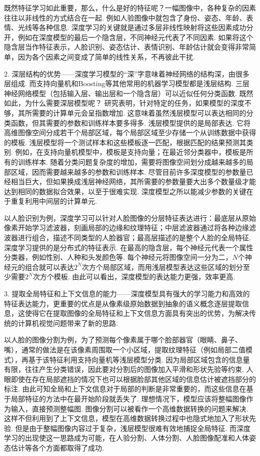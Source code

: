 既然特征学习如此重要，那么，什么是好的特征呢？一幅图像中，各种复杂的因素往往以非线性的方式结合在一起. 例如人验图像中就包含了身份、姿态、年龄、表情、光线等各种信息. 深度学习的关键就是通过多层非线性映射将这些因素成功分开，例如在深度模型的最后一个隐含层，不同神经元代表了不同因素. 如果将这个隐含层当作特征表示，人脸识别、姿态估计、表情识别、年龄估计就会变得非常简单，因为各个因素之间变成了简单的线性关系，不再彼此干扰.

2. 深层结构的优势——深度学习模型的“深”字意味着神经网络的结构深，由很多层组成. 而支持向量机和Boosting等其他常用的机器学习模型都是浅层结构. 三层神经网络模型（包括输入层、输出层和一个隐含层）可以近似任何分类函数. 既然如此，为什么需要深层模型呢？
研究表明，针对特定的任务，如果模型的深度不够，其所需要的计算单元会呈指数增加. 这意味着虽然浅层模型可以表达相同的分类函数，但其需要的参数和训练样本要多得多. 浅层模型提供的是局部表达. 它将高维图像空间分成若干个局部区域，每个局部区域至少存储一个从训练数据中获得的模板. 浅层模型将一个测试样本和这些模板逐一匹配，根据匹配的结果预测其类别. 例如，在支持向量机模型中，模板是支持向量；在最近邻分类器中，模板是所有的训练样本. 随着分类问题复杂度的增加，需要将图像空间划分成越来越多的局部区域，因而需要越来越多的参数和训练样本. 尽管目前许多深度模型的参数量已经相当巨大，但如果换成浅层神经网络，其所需要的参数量要大出多个数量级才能达到相同的数据拟合效果，以至于很难实现.
深度模型之所以能减少参数的关键在于重复利用中间层的计算单元.

\begin{example}
以人脸识别为例，深度学习可以针对人脸图像的分层特征表达进行：最底层从原始像素开始学习滤波器，刻画局部的边缘和纹理特征；中层滤波器通过将各种边缘滤波器进行组合，描述不同类型的人脸器官；最高层描述的是整个人脸的全局特征. 深度学习提供的是分布式的特征表示. 在最高的隐含层，每个神经元代表一个属性分类器，例如性别、人种和头发颜色等. 每个神经元将图像空间一分为二，$N$个神经元的组合就可以表达$2^N$次方个局部区域，而用浅层模型表达这些区域的划分至少需要$2^N$次方个模板. 由此可以看出，深度模型的表达能力更强，效率更高.
\end{example}

3. 提取全局特征和上下文信息的能力——深度模型具有强大的学习能力和高效的特征表达能力，更重要的优点是从像素级原始数据到抽象的语义概念逐层提取信息，这使得它在提取图像的全局特征和上下文信息方面具有突出的优势，为解决传统的计算机视觉问题带来了新的思路.

\begin{example}
以人脸的图像分割为例，为了预测每个像素属于哪个脸部器官（眼睛、鼻子、嘴），通常的做法是在该像素周围取一个小区域，提取纹理特征（例如局部二值模式），再基于该特征利用支持向量机等浅层模型分类. 因为局部区域包含的信息量有限，往往产生分类错误，因此要对分割后的图像加入平滑和形状先验等约束.
人眼即使在存在局部遮挡的情况下也可以根据脸部其他区域的信息估计被遮挡部分的标注. 由此可知全局和上下文信息对于局部的判断是非常重要的，而这些信息在基于局部特征的方法中在最开始阶段就丢失了. 理想情况下，模型应该将整幅图像作为输入，直接预测整幅图. 图像分割可以被看作一个高维数据转换的问题来解决. 这样不但利用到了上下文信息，模型在高维数据转换过程中也隐式地加入了形状先验. 但是由于整幅图像内容过于复杂，浅层模型很难有效地捕捉全局特征. 而深度学习的出现使这一思路成为可能，在人验分割、人体分割、人脸图像配准和人体姿态估计等各个方面都取得了成功.
\end{example}

